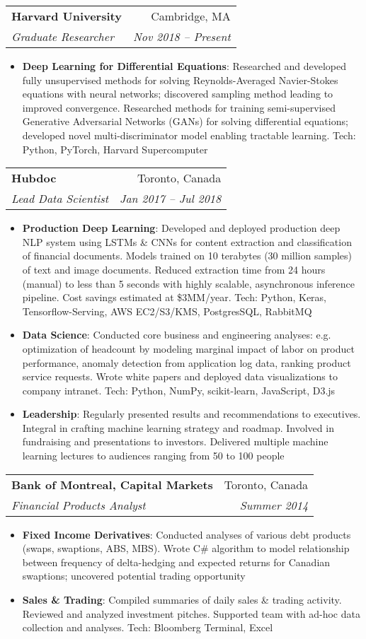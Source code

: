\documentclass[letterpaper,11pt]{article}
\makeatletter
\newcommand{\resumeItem}[2]{
  \item\small{
    \textbf{#1}{: #2 \vspace{-2pt}}
  }
}
\newcommand{\resumeSubheading}[4]{
  \vspace{-1pt}\item
    \begin{tabular*}{0.97\textwidth}[t]{l@{\extracolsep{\fill}}r}
      \textbf{#1} & #2 \\
      \textit{\small#3} & \textit{\small #4} \\
    \end{tabular*}\vspace{-5pt}
}
\newcommand{\resumeItemListStart}{\begin{itemize}}
\newcommand{\resumeItemListEnd}{\end{itemize}\vspace{-5pt}}
\makeatother
\begin{document}
  \resumeSubheading
    {Harvard University}{Cambridge, MA}
    {Graduate Researcher}{Nov 2018 -- Present}
    \resumeItemListStart
      \resumeItem{Deep Learning for Differential Equations}
        {Researched and developed fully unsupervised methods for solving Reynolds-Averaged Navier-Stokes equations with
        neural networks; discovered sampling method leading to improved convergence. Researched methods for training
        semi-supervised Generative Adversarial Networks (GANs) for solving differential equations; developed novel
        multi-discriminator model enabling tractable learning. Tech: Python, PyTorch, Harvard Supercomputer}
    \resumeItemListEnd

    \resumeSubheading
      {Hubdoc}{Toronto, Canada}
      {Lead Data Scientist}{Jan 2017 -- Jul 2018}
      \resumeItemListStart
        \resumeItem{Production Deep Learning}
          {Developed and deployed production deep NLP system using LSTMs \& CNNs for content extraction and
          classification of financial documents. Models trained on 10 terabytes (30 million samples) of text and image documents.
          Reduced extraction time from 24 hours (manual) to less than 5 seconds with highly scalable, asynchronous inference pipeline.
          Cost savings estimated at \$3MM/year. Tech: Python, Keras, Tensorflow-Serving, AWS EC2/S3/KMS, PostgresSQL, RabbitMQ}
        \resumeItem{Data Science}
          {Conducted core business and engineering analyses: e.g. optimization of headcount by modeling marginal impact of labor
          on product performance, anomaly detection from application log data, ranking product service requests. Wrote white papers and
          deployed data visualizations to company intranet. Tech: Python, NumPy, scikit-learn, JavaScript, D3.js}
        \resumeItem{Leadership}
          {Regularly presented results and recommendations to executives. Integral in crafting machine learning strategy and
          roadmap. Involved in fundraising and presentations to investors. Delivered multiple machine learning lectures to
          audiences ranging from 50 to 100 people}
      \resumeItemListEnd

    \resumeSubheading
      {Bank of Montreal, Capital Markets}{Toronto, Canada}
      {Financial Products Analyst}{Summer 2014}
      \resumeItemListStart
        \resumeItem{Fixed Income Derivatives}
          {Conducted analyses of various debt products (swaps, swaptions, ABS, MBS). Wrote C\# algorithm
          to model relationship between frequency of delta-hedging and expected returns for Canadian swaptions;
          uncovered potential trading opportunity}
        \resumeItem{Sales \& Trading}
          {Compiled summaries of daily sales \& trading activity. Reviewed and analyzed investment pitches. Supported
          team with ad-hoc data collection and analyses. Tech: Bloomberg Terminal, Excel}
      \resumeItemListEnd
\end{document}
